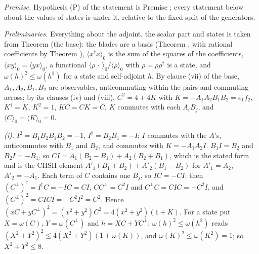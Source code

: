 \emph{Premise.} Hypothesis (P) of the statement is Premise ; every statement below about the values of states is under it, relative to the fixed split of the generators.

\emph{Preliminaries.} Everything about the adjoint, the scalar part and states is taken from Theorem  (the base): the blades are a basis (Theorem , with rational coefficients by Theorem ), $\langle x^{\dagger}x\rangle_{0}$ is the sum of the squares of the coefficients, $\langle xy\rangle_{0} = \langle yx\rangle_{0}$, a functional $\langle\rho\,\cdot\,\rangle_{0}/\langle\rho\rangle_{0}$ with $\rho = \rho\rho^{\dagger}$ is a state, and $\omega(h)^{2} \le \omega(h^{2})$ for a state and self-adjoint $h$. By clause (vii) of the base, $A_{1}, A_{2}, B_{1}, B_{2}$ are observables, anticommuting within the pairs and commuting across; by its clauses (iv) and (viii), $C^{2} = 4 + 4K$ with $K = -A_{1}A_{2}B_{1}B_{2} = e_{1}f_{2}$, $K^{\dagger} = K$, $K^{2} = 1$, $KC = CK = C$, $K$ commutes with each $A_{i}B_{j}$, and $\langle C\rangle_{0} = \langle K\rangle_{0} = 0$.

\emph{(i).} $I^{2} = B_{1}B_{2}B_{1}B_{2} = -1$, $I^{\dagger} = B_{2}B_{1} = -I$; $I$ commutes with the $A$'s, anticommutes with $B_{1}$ and $B_{2}$, and commutes with $K = -A_{1}A_{2}I$. $B_{1}I = B_{2}$ and $B_{2}I = -B_{1}$, so $CI = A_{1}(B_{2} - B_{1}) + A_{2}(B_{2} + B_{1})$, which is the stated form and is the CHSH element $A'_{1}(B_{1} + B_{2}) + A'_{2}(B_{1} - B_{2})$ for $A'_{1} = A_{2}$, $A'_{2} = -A_{1}$. Each term of $C$ contains one $B_{j}$, so $IC = -CI$; then $(C^{\perp})^{\dagger} = I^{\dagger}C = -IC = CI$, $CC^{\perp} = C^{2}I$ and $C^{\perp}C = CIC = -C^{2}I$, and $(C^{\perp})^{2} = CICI = -C^{2}I^{2} = C^{2}$. Hence $(xC + yC^{\perp})^{2} = (x^{2} + y^{2})C^{2} = 4(x^{2} + y^{2})(1 + K)$. For a state put $X = \omega(C)$, $Y = \omega(C^{\perp})$ and $h = XC + YC^{\perp}$: $\omega(h)^{2} \le \omega(h^{2})$ reads $(X^{2} + Y^{2})^{2} \le 4(X^{2} + Y^{2})(1 + \omega(K))$, and $\omega(K)^{2} \le \omega(K^{2}) = 1$; so $X^{2} + Y^{2} \le 8$.

